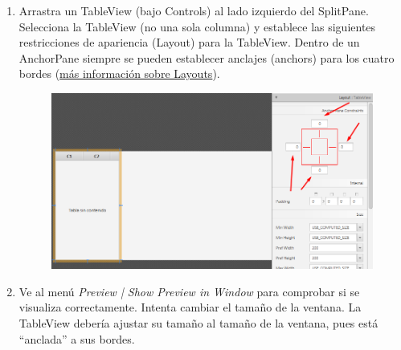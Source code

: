 \begin{enumerate}
	\item Arrastra un TableView (bajo Controls) al lado izquierdo del SplitPane. Selecciona la TableView (no una sola columna) y establece las siguientes restricciones de apariencia (Layout) para la TableView. Dentro de un AnchorPane siempre se pueden establecer anclajes (anchors) para los cuatro bordes (\textcolor{azul}{\href{https://docs.oracle.com/javase/8/javafx/layout-tutorial/builtin_layouts.htm}{más información sobre Layouts}}).
		\begin{figure}[H]
		\includegraphics[width=14cm]{img/TableView}
	\end{figure}
	
	\item Ve al menú \textit{Preview | Show Preview in Window} para comprobar si se visualiza correctamente. Intenta cambiar el tamaño de la ventana. La TableView debería ajustar su tamaño al tamaño de la ventana, pues está “anclada” a sus bordes.
	

\end{enumerate}
